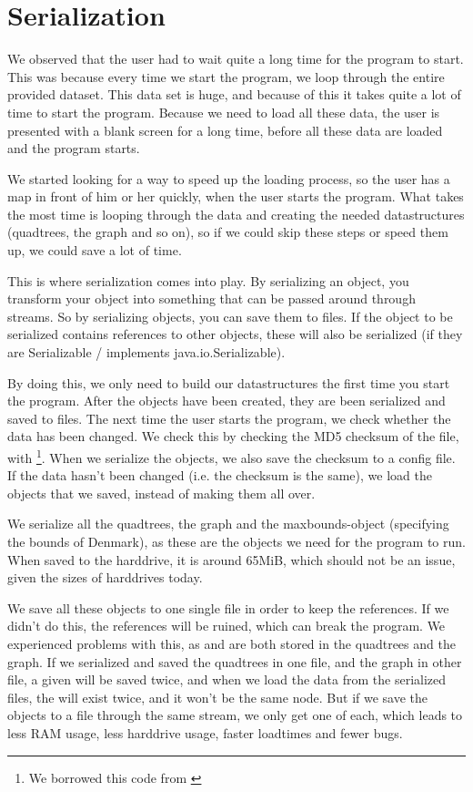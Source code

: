 \section{Serialization}
\label{IMPL-SERI}
We observed that the user had to wait quite a long time for the program to start. This
was because every time we start the program, we loop through the entire provided
dataset. This data set is huge, and because of this it takes quite a lot of time
to start the program. Because we need to load all these data, the user is presented with a blank screen for a long time, before all these data are loaded and the program starts.

We started looking for a way to speed up the loading process, so the user has a map in
front of him or her quickly, when the user starts the program. What takes the most time
is looping through the data and creating the needed datastructures (quadtrees, the
graph and so on), so if we could skip these steps or speed them up, we could save a lot
of time.

This is where serialization comes into play. By serializing an object, you transform your
object into something that can be passed around through streams. So by
serializing objects, you can save them to files. If the object to be serialized contains
references to other objects, these will also be serialized (if they are Serializable /
implements java.io.Serializable).

By doing this, we only need to build our datastructures the first time you start the program.
After the objects have been created, they are been serialized and saved to files. The next
time the user starts the program, we check whether the data has been changed. We check
this by checking the MD5 checksum of the file, with
\footnote{We borrowed this code from \cite{MD5}}. When we serialize 
the objects, we also save the checksum to a config file. If the data hasn't been changed 
(i.e. the checksum is the same), we load the objects that we saved, instead of making them 
all over.

We serialize all the quadtrees, the graph and the maxbounds-object (specifying the bounds
of Denmark), as these are the objects we need for the program to run. When saved to the
harddrive, it is around 65MiB, which should not be an issue, given the sizes of
harddrives today.

We save all these objects to one single file in order to keep the references. If we didn't do
this, the references will be ruined, which can break the program. We experienced problems
with this, as  and  are both stored in the quadtrees
and the graph. If we serialized and saved the quadtrees in one file, and the
graph in other file, a given  will be saved twice, and when we load
the data from the serialized files, the  will exist twice, and it won't be
the same node. But if we save the objects to a file through the same stream, we
only get one of each, which leads to less RAM usage, less harddrive usage,
faster loadtimes and fewer bugs.

